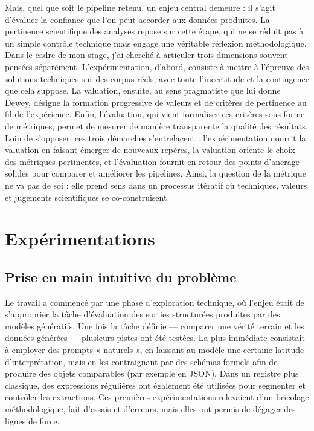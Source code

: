 Mais, quel que soit le pipeline retenu, un enjeu central demeure : il s’agit d’évaluer la confiance que l’on peut accorder aux données produites. La pertinence scientifique des analyses repose sur cette étape, qui ne se réduit pas à un simple contrôle technique mais engage une véritable réflexion méthodologique. Dans le cadre de mon stage, j’ai cherché à articuler trois dimensions souvent pensées séparément. L’expérimentation, d’abord, consiste à mettre à l’épreuve des solutions techniques sur des corpus réels, avec toute l’incertitude et la contingence que cela suppose. La valuation, ensuite, au sens pragmatiste que lui donne Dewey, désigne la formation progressive de valeurs et de critères de pertinence au fil de l’expérience. Enfin, l’évaluation, qui vient formaliser ces critères sous forme de métriques, permet de mesurer de manière transparente la qualité des résultats. Loin de s’opposer, ces trois démarches s’entrelacent : l’expérimentation nourrit la valuation en faisant émerger de nouveaux repères, la valuation oriente le choix des métriques pertinentes, et l’évaluation fournit en retour des points d’ancrage solides pour comparer et améliorer les pipelines. Ainsi, la question de la métrique ne va pas de soi : elle prend sens dans un processus itératif où techniques, valeurs et jugements scientifiques se co-construisent.

\chapter{Expérimentations}

\section{Prise en main intuitive du problème}

Le travail a commencé par une phase d’exploration technique, où l’enjeu était de s’approprier la tâche d’évaluation des sorties structurées produites par des modèles génératifs. Une fois la tâche définie — comparer une vérité terrain et les données générées — plusieurs pistes ont été testées. La plus immédiate consistait à employer des prompts « naturels », en laissant au modèle une certaine latitude d’interprétation, mais en les contraignant par des schémas formels afin de produire des objets comparables (par exemple en JSON). Dans un registre plus classique, des expressions régulières ont également été utilisées pour segmenter et contrôler les extractions. Ces premières expérimentations relevaient d’un bricolage méthodologique, fait d’essais et d’erreurs, mais elles ont permis de dégager des lignes de force.

